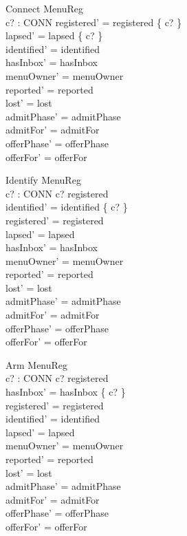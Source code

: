 \documentclass[a4paper,10pt,fleqn]{article}
\begin{document}
\begin{schema}{Connect}
  \Delta MenuReg \\
  c? : CONN
\where
  registered' = registered \cup \{ c? \} \\
  lapsed' = lapsed \setminus \{ c? \} \\
  identified' = identified \\
  hasInbox' = hasInbox \\
  menuOwner' = menuOwner \\
  reported' = reported \\
  lost' = lost \\
  admitPhase' = admitPhase \\
  admitFor' = admitFor \\
  offerPhase' = offerPhase \\
  offerFor' = offerFor
\end{schema}

\begin{schema}{Identify}
  \Delta MenuReg \\
  c? : CONN
\where
  c? \in registered \\
  identified' = identified \cup \{ c? \} \\
  registered' = registered \\
  lapsed' = lapsed \\
  hasInbox' = hasInbox \\
  menuOwner' = menuOwner \\
  reported' = reported \\
  lost' = lost \\
  admitPhase' = admitPhase \\
  admitFor' = admitFor \\
  offerPhase' = offerPhase \\
  offerFor' = offerFor
\end{schema}

\begin{schema}{Arm}
  \Delta MenuReg \\
  c? : CONN
\where
  c? \in registered \\
  hasInbox' = hasInbox \cup \{ c? \} \\
  registered' = registered \\
  identified' = identified \\
  lapsed' = lapsed \\
  menuOwner' = menuOwner \\
  reported' = reported \\
  lost' = lost \\
  admitPhase' = admitPhase \\
  admitFor' = admitFor \\
  offerPhase' = offerPhase \\
  offerFor' = offerFor
\end{schema}
\end{document}
